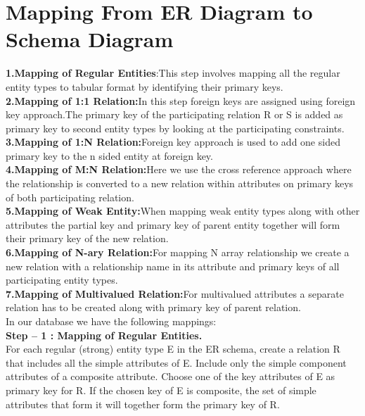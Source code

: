 \documentclass[12pt,a4paper]{report}
\begin{document}
\section{Mapping From ER Diagram to Schema Diagram}
\textbf{1.Mapping of Regular Entities}:This step involves mapping all the regular entity types to tabular format by identifying their primary keys.\\
\textbf{2.Mapping of 1:1 Relation:}In this step foreign keys are assigned using foreign key approach.The primary key of the participating relation R or S is added as primary key to second entity types by looking at the participating constraints.\\
\textbf{3.Mapping of 1:N Relation:}Foreign key approach is used to add one sided primary key to the n sided entity at foreign key.\\
\textbf{4.Mapping of M:N Relation:}Here we use the cross reference approach where the relationship is converted to a new relation within attributes on primary keys of both participating relation.\\
\textbf{5.Mapping of Weak Entity:}When mapping weak entity types along with other attributes the partial key and primary key of parent entity together will form their primary key of the new relation.\\
\textbf{6.Mapping of N-ary Relation:}For mapping N array relationship we create a new relation with a relationship name in its attribute and primary keys of all participating entity types.\\
\textbf{7.Mapping of Multivalued Relation:}For multivalued attributes a separate relation has to be created along with primary key of parent relation.\\
In our database we have the following mappings:\\
\linebreak
\textbf{Step – 1 : Mapping of Regular Entities.}\\
For each regular (strong) entity type E in the ER schema, create a relation R that includes all the simple attributes of E. Include only the simple component attributes of a
composite attribute. Choose one of the key attributes of E as primary key for R. If the
chosen key of E is composite, the set of simple attributes that form it will together form
the primary key of R.\\
\end{document}
